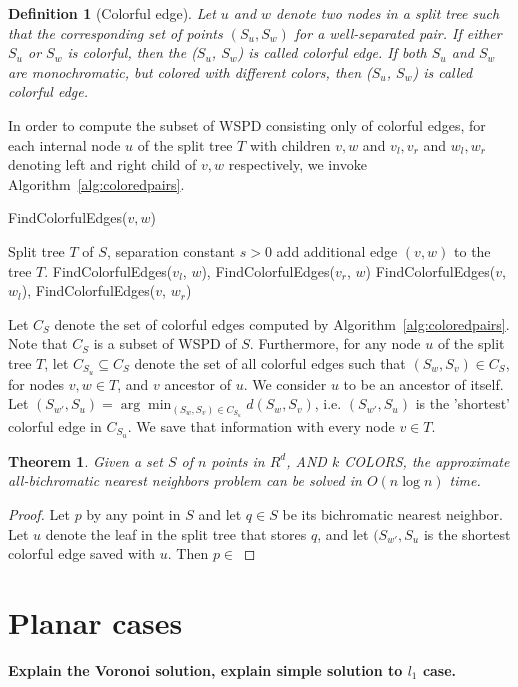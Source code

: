 \documentclass{article}
\newcommand\todo[1]{{\bf \textcolor{bordeaux}{#1}}}
\newtheorem{definition}{Definition}
\newtheorem{theorem}{Theorem}
\newtheorem{proof}{Proof}
\begin{document}
\begin{definition}[Colorful edge]
Let $u$ and $w$ denote two nodes in a split tree such that the corresponding 
set of points $(S_u, S_w)$ for a well-separated pair. If either $S_u$ or $S_w$ is colorful, then the ($S_u$, $S_w$) is called
colorful edge. If both $S_u$ and $S_w$ are monochromatic, but colored with different colors, then ($S_u$, $S_w$) is called colorful edge. 
\end{definition}
In order to compute the subset of WSPD consisting only of colorful edges, for each internal node $u$ of the split tree $T$ with
children $v,w$ and $v_l, v_r$ and $w_l, w_r$ denoting left and right child of $v,w$ respectively, we invoke Algorithm~\ref{alg:coloredpairs}. 
\begin{algorithm}
\caption{FindColorfulEdges($v, w$)}\label{alg:coloredpairs}
\begin{algorithmic}
\Require Split tree $T$ of $S$, separation constant $s>0$
    \State add additional edge $(v, w)$ to the tree $T$.
    \State FindColorfulEdges($v_l$, $w$), FindColorfulEdges($v_r$, $w$)
\Else
    \State FindColorfulEdges($v$, $w_l$), FindColorfulEdges($v$, $w_r$)
\EndIf
\end{algorithmic}
\end{algorithm}
Let $C_S$ denote the set of colorful edges computed by Algorithm~\ref{alg:coloredpairs}. 
Note that $C_S$ is a subset of WSPD of $S$. Furthermore, for 
any node $u$ of the split tree $T$, let $C_{S_u}\subseteq C_S$ denote the
set of all colorful edges such that $(S_w, S_v)\in C_S$, for nodes $v, w \in T$, and 
$v$ ancestor of $u$. We 
consider $u$ to be an ancestor of itself. 
Let $(S_{w'}, S_u) = \arg\min_{(S_w, S_v)\in C_{S_u}} d(S_w, S_v)$, i.e. $(S_{w'}, S_u)$ is 
the 'shortest' colorful edge in $C_{S_u}$. We save that information with every node $v\in T$. 
\begin{theorem}
Given a set $S$ of $n$ points in $R^d$, AND $k$ COLORS,  the approximate 
all-bichromatic nearest neighbors problem can be solved in $O(n \log n)$ time. 
\end{theorem}
\begin{proof}
Let $p$ by any point in $S$ and let $q\in S$ be its bichromatic nearest neighbor. Let $u$
denote the leaf in the split tree that stores $q$, and let $(S_{w'}, S_u$ is the 
shortest colorful edge saved with $u$. Then $p\in $
\end{proof}

\section*{Planar cases}
\todo{Explain the Voronoi solution, explain simple solution to $l_1$ case.}



  
  
\end{document}
